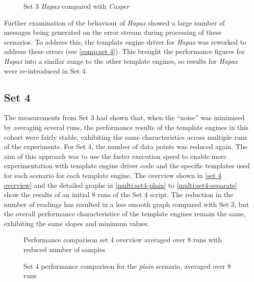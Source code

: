 \begin{figure}[!p]
\centering

\caption{\label{multi:set3-c-h}Set 3 \emph{Hapax} compared with \emph{Casper}}
\end{figure}

Further examination of the behaviour of \emph{Hapax} showed a large number of messages being generated on the error stream during processing of these scenarios. To address this, the \gls{template engine} driver for \emph{Hapax} was reworked to address these errors (see \autoref{comp:set 4}). This brought the performance figures for \emph{Hapax} into a similar range to the other \gls{template engine}s, so results for \emph{Hapax} were re-introduced in Set 4. 

\subsection{Set 4}
\label{comp:set 4}

The measurements from Set 3 had shown that, when the \enquote{noise} was minimised by averaging several runs, the performance results of the \gls{template engine}s in this cohort were fairly stable, exhibiting the same characteristics across multiple runs of the experiments. For Set 4, the number of data points was reduced again. The aim of this approach was to use the faster execution speed to enable more experimentation with \gls{template engine} driver code and the specific templates used for each scenario for each \gls{template engine}. The overview shown in \autoref{set 4 overview} and the detailed graphs in \autoref{multi:set4-plain} to \autoref{multi:set4-separate} show the results of an initial 8 runs of the Set 4 script. The reduction in the number of readings has resulted in a less smooth graph compared with Set 3, but the overall performance characteristics of the \gls{template engine}s remain the same, exhibiting the same slopes and minimum values.

\begin{figure}[!p]
\centering

\caption{\label{set 4 overview}Performance comparison set 4 overview averaged over 8 runs with reduced number of samples}
\end{figure}

\begin{figure}[!p]
\centering

\caption{\label{multi:set4-plain}Set 4 performance comparison for the \emph{plain} scenario, averaged over 8 runs}
\end{figure}

